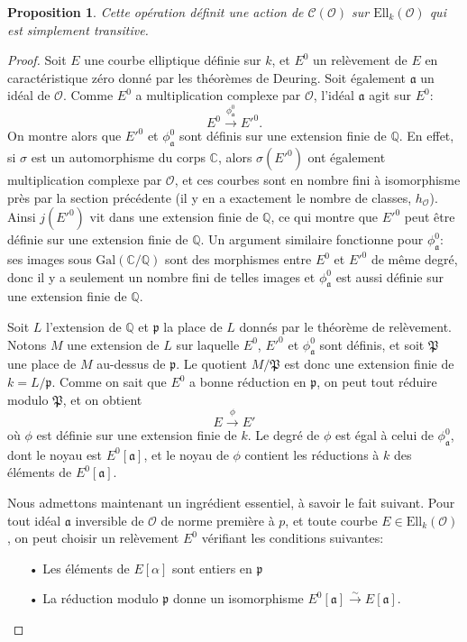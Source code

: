 \documentclass[11pt,a4paper]{article}
\newcommand{\C}{\mathbb{C}}
\newcommand{\Q}{\mathbb{Q}}
\renewcommand{\O}{\mathcal{O}}
\newcommand{\Cl}{\mathcal{C}}
\newcommand{\vers}{\longrightarrow}
\newcommand{\Ell}{\mathrm{Ell}}
\newcommand{\Gal}{\mathrm{Gal}}
\renewcommand{\frak}{\mathfrak}
\newtheorem*{prop}{Proposition}
\theoremstyle{definition}
\begin{document}
\begin{prop}

Cette opération définit une action de $\Cl(\O)$ sur $\Ell_k(\O)$ qui est simplement transitive.
\end{prop}

\begin{proof}

Soit $E$ une courbe elliptique définie sur $k$, et $E^0$ un relèvement de $E$ en caractéristique zéro donné par les théorèmes de Deuring. Soit également $\frak a$ un idéal de $\O$. Comme $E^0$ a multiplication complexe par $\O$, l'idéal $\frak a$ agit sur $E^0$:
$$E^0 \overset{\phi_{\frak a}^0}{\vers} E'^0.$$
On montre alors que $E'^0$ et $\phi_{\frak a}^0$ sont définis sur une extension finie de $\Q$. En effet, si $\sigma$ est un automorphisme du corps $\C$, alors $\sigma(E'^0)$ ont également multiplication complexe par $\O$, et ces courbes sont en nombre fini à isomorphisme près par la section précédente (il y en a exactement le nombre de classes, $h_\O$). Ainsi $j(E'^0)$ vit dans une extension finie de $\Q$, ce qui montre que $E'^0$ peut être définie sur une extension finie de $\Q$. Un argument similaire fonctionne pour $\phi_{\frak a}^0$: ses images sous $\Gal(\C/\Q)$ sont des morphismes entre $E^0$ et $E'^0$ de même degré, donc il y a seulement un nombre fini de telles images et $\phi_{\frak a}^0$ est aussi définie sur une extension finie de $\Q$.

Soit $L$ l'extension de $\Q$ et $\frak p$ la place de $L$ donnés par le théorème de relèvement. Notons $M$ une extension de $L$ sur laquelle $E^0$, $E'^0$ et $\phi_{\frak a}^0$ sont définis, et soit $\frak P$ une place de $M$ au-dessus de $\frak p$. Le quotient $M/\frak P$ est donc une extension finie de $k = L/\frak p$. Comme on sait que $E^0$ a bonne réduction en $\frak p$, on peut tout réduire modulo $\frak P$, et on obtient
$$E \overset{\phi}{\vers} E'$$
où $\phi$ est définie sur une extension finie de $k$. Le degré de $\phi$ est égal à celui de $\phi_{\frak a}^0$, dont le noyau est $E^0[\frak a]$, et le noyau de $\phi$ contient les réductions à $k$ des éléments de $E^0[\frak a]$. 

Nous admettons maintenant un ingrédient essentiel, à savoir le fait suivant. Pour tout idéal $\frak a$ inversible de $\O$ de norme première à $p$, et toute courbe $E\in \Ell_k(\O)$, on peut choisir un relèvement $E^0$ vérifiant les conditions suivantes:
\begin{itemize}
\item[•] Les éléments de $E[\alpha]$ sont entiers en $\frak p$
\item[•] La réduction modulo $\frak p$ donne un isomorphisme $E^0[\frak a] \overset{\sim}{\to} E[\frak a]$.
\end{itemize}


\end{proof}
\end{document}
